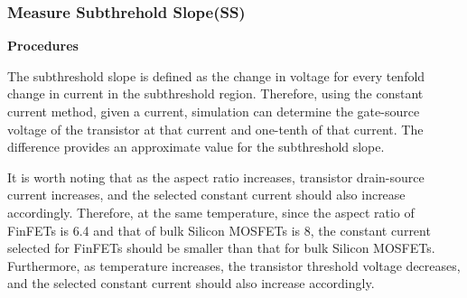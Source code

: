 \documentclass[UTF8,12pt,a4paper]{article}
\begin{document}
\setlength{\arrayrulewidth}{0.9pt} %
\begin{table}[h]
    \centering
    \caption{$I_{\text{on}}$, $I_{\text{off}}$ and $V_{\text{T}}$ for four transistors at temp = $90^\circ$C}
    \label{I_V_temp90}
\end{table}


\subsubsection{Measure Subthrehold Slope(SS)}

\textbf{Procedures}

The subthreshold slope is defined as the change in voltage for every tenfold change in current in the subthreshold region. Therefore, using the constant current method, given a current, simulation can determine the gate-source voltage of the transistor at that current and one-tenth of that current. The difference provides an approximate value for the subthreshold slope.

It is worth noting that as the aspect ratio increases, transistor drain-source current increases, and the selected constant current should also increase accordingly. Therefore, at the same temperature, since the aspect ratio of FinFETs is 6.4 and that of bulk Silicon MOSFETs is 8, the constant current selected for FinFETs should be smaller than that for bulk Silicon MOSFETs. Furthermore, as temperature increases, the transistor threshold voltage decreases, and the selected constant current should also increase accordingly.
\end{document}
